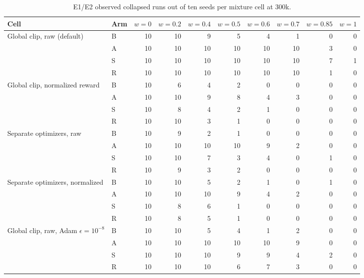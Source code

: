 \begin{table}[H]
\caption{E1/E2 observed collapsed runs out of ten seeds per mixture cell at 300k.}
\label{tab:factorial_cells}
\centering\scriptsize
\begin{tabular}{@{}llrrrrrrrr@{}}
\toprule
Cell & Arm & $w{=}0$ & $w{=}0.2$ & $w{=}0.4$ & $w{=}0.5$ & $w{=}0.6$ & $w{=}0.7$ & $w{=}0.85$ & $w{=}1$ \\
\midrule
Global clip, raw (default) & B & 10 & 10 & 9 & 5 & 4 & 1 & 0 & 0 \\
 & A & 10 & 10 & 10 & 10 & 10 & 10 & 3 & 0 \\
 & S & 10 & 10 & 10 & 10 & 10 & 10 & 7 & 1 \\
 & R & 10 & 10 & 10 & 10 & 10 & 10 & 1 & 0 \\
Global clip, normalized reward & B & 10 & 6 & 4 & 2 & 0 & 0 & 0 & 0 \\
 & A & 10 & 10 & 9 & 8 & 4 & 3 & 0 & 0 \\
 & S & 10 & 8 & 4 & 2 & 1 & 0 & 0 & 0 \\
 & R & 10 & 10 & 3 & 1 & 0 & 0 & 0 & 0 \\
Separate optimizers, raw & B & 10 & 9 & 2 & 1 & 0 & 0 & 0 & 0 \\
 & A & 10 & 10 & 10 & 10 & 9 & 2 & 0 & 0 \\
 & S & 10 & 10 & 7 & 3 & 4 & 0 & 1 & 0 \\
 & R & 10 & 9 & 3 & 2 & 0 & 0 & 0 & 0 \\
Separate optimizers, normalized & B & 10 & 10 & 5 & 2 & 1 & 0 & 1 & 0 \\
 & A & 10 & 10 & 10 & 9 & 4 & 2 & 0 & 0 \\
 & S & 10 & 8 & 6 & 1 & 0 & 0 & 0 & 0 \\
 & R & 10 & 8 & 5 & 1 & 0 & 0 & 0 & 0 \\
Global clip, raw, Adam $\epsilon{=}10^{-8}$ & B & 10 & 10 & 5 & 4 & 1 & 2 & 0 & 0 \\
 & A & 10 & 10 & 10 & 10 & 10 & 9 & 0 & 0 \\
 & S & 10 & 10 & 10 & 9 & 9 & 4 & 2 & 0 \\
 & R & 10 & 10 & 10 & 6 & 7 & 3 & 0 & 0 \\
\bottomrule
\end{tabular}
\end{table}
